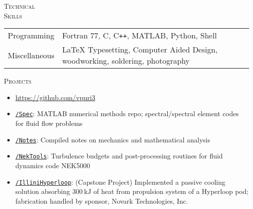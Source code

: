 \documentclass[10pt]{article}
\begin{document}
\vspace{-1.5em}
\begin{multicols}{2}
\textsc{\small Technical \\ Skills}
\columnbreak

\begin {table}[H]
\begin{tabular}{l l }
\hspace{-0.5em}Programming   & \hspace{-0.0em} Fortran 77, C, C\texttt{++}, MATLAB, Python, Shell\\
\hspace{-0.5em}Miscellaneous & \hspace{-0.0em} \LaTeX{} Typesetting, Computer Aided Design, woodworking, soldering, photography \\
\end{tabular}	
\end{table}

\vspace{-1.0em}
\end{multicols}
\vspace{-1.5em}
\begin{multicols}{2}
\textsc{\small Projects}
\columnbreak

\vspace{-1.75em}
\begin{itemize}[label=-]
    \setlength{\itemindent}{-1.75em}
    \setlength\itemsep{-0.25em}
    \item[]\hspace{-1.0em} \url{https://github.com/vpuri3}
    \item \href{https://github.com/vpuri3/Spec}{\texttt{/Spec}}: MATLAB numerical methods repo; spectral/spectral element codes for fluid flow problems
    \item \href{https://github.com/vpuri3/Notes}{\texttt{/Notes}}: Compiled notes on mechanics and mathematical analysis
    \item \href{https://github.com/vpuri3/NekTools}{\texttt{/NekTools}}: Turbulence budgets and post-processing routines for fluid dynamics code NEK5000
    \item \href{https://github.com/vpuri3/IlliniHyperloop}{\texttt{/IlliniHyperloop}}: (Capstone Project) Implemented a passive cooling solution absorbing $\SI{300}{\kilo \joule}$ of heat from propulsion system of a Hyperloop pod; fabrication handled by sponsor, Novark Technologies, Inc.
\end{itemize}
\vspace{-2.0em}

\end{multicols}
\vspace{-1.5em}
\vfill
\end{document}
